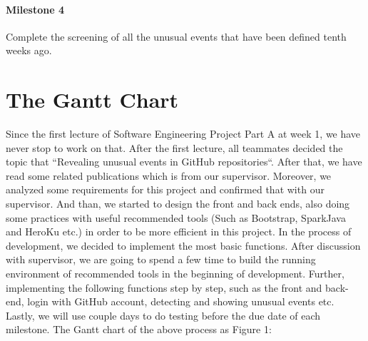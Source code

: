 \documentclass[conference]{IEEEtran}
\begin{document}
\paragraph{\textbf{Milestone 4}}
Complete the screening of all the unusual events that have been defined tenth weeks ago.\\


\section{The Gantt Chart}

Since the first lecture of Software Engineering Project Part A at week 1, we have never stop to work on that. After the first lecture, all teammates decided the topic that “Revealing unusual events in GitHub repositories“. After that, we have read some related publications which is from our supervisor. Moreover, we analyzed some requirements for this project and confirmed that with our supervisor. And than, we started to design the front and back ends, also doing some practices with useful recommended tools (Such as Bootstrap, SparkJava and HeroKu etc.) in order to be more efficient in this project. In the process of development, we decided to implement the most basic functions. After discussion with supervisor, we are going to spend a few time to build the running environment of recommended tools in the beginning of development. Further, implementing the following functions step by step, such as the front and back-end, login with GitHub account, detecting and showing unusual events etc. Lastly, we will use couple days to do testing before the due date of each milestone. The Gantt chart of the above process as Figure 1:
\end{document}
